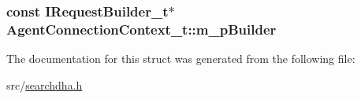 \hypertarget{structAgentConnectionContext__t_a80006cc7fa860f2fccfa59f3a59a1526}{
\subsubsection[{m\-\_\-p\-Builder}]{\setlength{\rightskip}{0pt plus 5cm}const {\bf I\-Request\-Builder\-\_\-t}$\ast$ Agent\-Connection\-Context\-\_\-t\-::m\-\_\-p\-Builder}}\label{structAgentConnectionContext__t_a80006cc7fa860f2fccfa59f3a59a1526}


The documentation for this struct was generated from the following file\-:\begin{DoxyCompactItemize}
\item 
src/\hyperlink{searchdha_8h}{searchdha.\-h}\end{DoxyCompactItemize}
